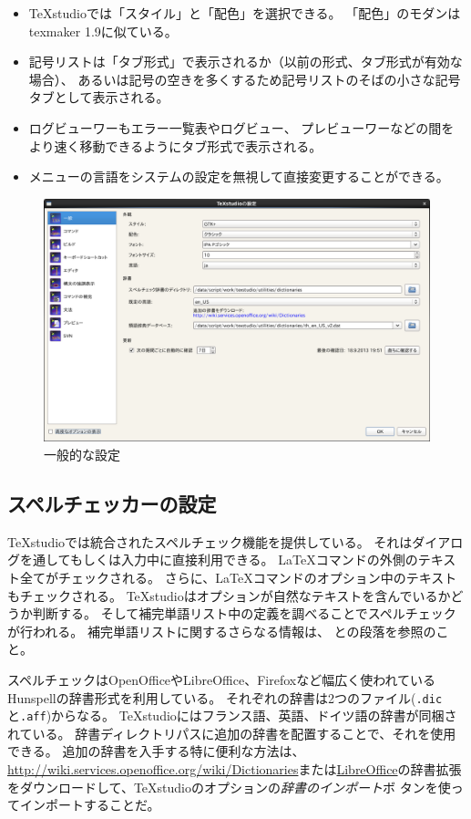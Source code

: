 \begin{itemize}
\item
  TeXstudioでは「スタイル」と「配色」を選択できる。
  「配色」のモダンはtexmaker 1.9に似ている。
\item
  記号リストは「タブ形式」で表示されるか（以前の形式、タブ形式が有効な場合）、
  あるいは記号の空きを多くするため記号リストのそばの小さな記号タブとして表示される。
\item
  ログビューワーもエラー一覧表やログビュー、
  プレビューワーなどの間をより速く移動できるようにタブ形式で表示される。
\item
  メニューの言語をシステムの設定を無視して直接変更することができる。
\end{itemize}

\begin{figure}[H]
  \centering
  \includegraphics[width=.8\linewidth]{configure_general.png}
  \caption{一般的な設定}
\end{figure}

\subsection{スペルチェッカーの設定}

TeXstudioでは統合されたスペルチェック機能を提供している。
それはダイアログを通してもしくは入力中に直接利用できる。
LaTeXコマンドの外側のテキスト全てがチェックされる。
さらに、LaTeXコマンドのオプション中のテキストもチェックされる。
TeXstudioはオプションが自然なテキストを含んでいるかどうか判断する。
そして補完単語リスト中の定義を調べることでスペルチェックが行われる。
補完単語リストに関するさらなる情報は、
との段落を参照のこと。

スペルチェックはOpenOfficeやLibreOffice、Firefoxなど幅広く使われているHunspellの辞書形式を利用している。
それぞれの辞書は2つのファイル(\verb+.dic+と\verb+.aff+)からなる。
TeXstudioにはフランス語、英語、ドイツ語の辞書が同梱されている。
辞書ディレクトリパスに追加の辞書を配置することで、それを使用できる。
追加の辞書を入手する特に便利な方法は、\href{http://extensions.openoffice.org/}{http://wiki.services.openoffice.org/wiki/Dictionaries}または\href{http://extensions.libreoffice.org/extension-center?getCategories=Dictionary}{LibreOffice}の辞書拡張をダウンロードして、TeXstudioのオプションの\emph{辞書のインポート}ボ
タンを使ってインポートすることだ。

